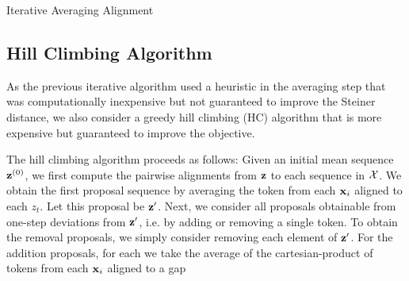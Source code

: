\documentclass{article}
\begin{document}
\begin{algorithm}[h]
\begin{algorithmic}

    \EndFor
\EndFor
{}
\EndFunction

\EndWhile
{}
\EndFunction

\Else
{}
\EndIf
\EndFor
\Return{$\bz$}
\EndFunction

\end{algorithmic}
\caption{\label{alg:ia}
Iterative Averaging Alignment
}
\end{algorithm}

\subsection{Hill Climbing Algorithm}
As the previous iterative algorithm used a heuristic in the averaging step
that was computationally inexpensive but not guaranteed to improve the Steiner distance,
we also consider a greedy hill climbing (HC) algorithm that is more expensive but
guaranteed to improve the objective.

The hill climbing algorithm proceeds as follows: Given an initial mean sequence $\mathbf{z}^{(0)}$,
we first compute the pairwise alignments from $\bz$ to each sequence in $\mathcal{X}$.
We obtain the first proposal sequence by averaging the token from each $\mathbf{x}_i$ aligned
to each $z_t$.
Let this proposal be $\mathbf{z}'$.
Next, we consider all proposals obtainable from one-step deviations
from $\mathbf{z}'$, 
i.e. by adding or removing a single token.
To obtain the removal proposals, we simply consider removing each element of $\mathbf{z}'$.
For the addition proposals, for each we take the average of the cartesian-product of tokens from each
$\mathbf{x}_i$ aligned to a gap
\end{document}
